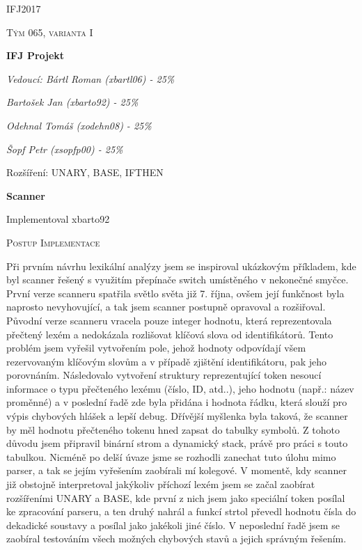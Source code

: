 \documentclass[12pt,a4paper]{report}
\begin{document}
    \begin{titlepage}
        \centering
        {\scshape\LARGE IFJ2017 \par}
        \vspace{1cm}
        {\scshape\Large Tým 065, varianta I\par}
        \vspace{1.5cm}
        {\huge\bfseries IFJ Projekt\par}
        \vspace{2cm}
        {\Large\itshape Vedoucí: Bártl Roman (xbartl06) - 25\%\par}
        {\Large\itshape Bartošek Jan (xbarto92) - 25\%\par}
        {\Large\itshape Odehnal Tomáš (xodehn08) - 25\%\par}
        {\Large\itshape Šopf Petr (xsopfp00) - 25\%\par}
        \vfill
        {\large Rozšíření: UNARY, BASE, IFTHEN}
    \end{titlepage}


    {\huge\bfseries Scanner \par}
    Implementoval xbarto92 \par
    \vspace{1cm}

    {\scshape\Large Postup Implementace\par}
    \vspace{0.3cm}
    \noindent Při prvním návrhu lexikální analýzy jsem se inspiroval ukázkovým příkladem, kde byl scanner řešený s využitím přepínače switch umístěného v nekonečné smyčce. První verze scanneru spatřila světlo světa již 7. října, ovšem její funkčnost byla naprosto nevyhovující, a tak jsem scanner postupně opravoval a rozšiřoval. Původní verze scanneru vracela pouze integer hodnotu, která reprezentovala přečtený lexém a nedokázala rozlišovat klíčová slova od identifikátorů. Tento problém jsem vyřešil vytvořením pole, jehož hodnoty odpovídají všem rezervovaným klíčovým slovům a v případě zjištění identifikátoru, pak jeho porovnáním. Následovalo vytvoření struktury reprezentující token nesoucí informace o typu přečteného lexému (číslo, ID, atd..), jeho hodnotu (např.: název proměnné) a v poslední řadě zde byla přidána i hodnota řádku, která slouží pro výpis chybových hlášek a lepší debug. Dřívější myšlenka byla taková, že scanner by měl hodnotu přečteného tokenu hned zapsat do tabulky symbolů. Z tohoto důvodu jsem připravil binární strom a dynamický stack, právě pro práci s touto tabulkou. Nicméně po delší úvaze jsme se rozhodli zanechat tuto úlohu mimo parser, a tak se jejím vyřešením zaobírali mí kolegové. V momentě, kdy scanner již obstojně interpretoval jakýkoliv příchozí lexém jsem se začal zaobírat rozšířeními UNARY a BASE, kde první z nich jsem jako speciální token posílal ke zpracování parseru, a ten druhý nahrál a funkcí strtol převedl hodnotu čísla do dekadické soustavy a posílal jako jakékoli jiné číslo. V neposlední řadě jsem se zaobíral testováním všech možných chybových stavů a jejich správným řešením.
    \vspace{1cm}
\end{document}
